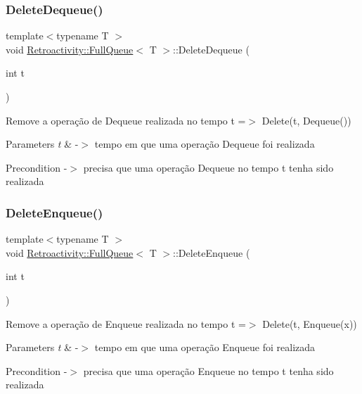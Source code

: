 \subsubsection{\texorpdfstring{Delete\+Dequeue()}{DeleteDequeue()}}
{\footnotesize\ttfamily template$<$typename T $>$ \\
void \hyperlink{classRetroactivity_1_1FullQueue}{Retroactivity\+::\+Full\+Queue}$<$ T $>$\+::Delete\+Dequeue (\begin{DoxyParamCaption}\item[{int}]{t }\end{DoxyParamCaption})}

Remove a operação de Dequeue realizada no tempo t =$>$ Delete(t, Dequeue())


\begin{DoxyParams}{Parameters}
{\em t} & -\/$>$ tempo em que uma operação Dequeue foi realizada \\
\hline
\end{DoxyParams}
\begin{DoxyPrecond}{Precondition}
-\/$>$ precisa que uma operação Dequeue no tempo t tenha sido realizada 
\end{DoxyPrecond}
\mbox{\label{classRetroactivity_1_1FullQueue_a017c3413e3df46315b1ffe23fdb9f52e}} 
\subsubsection{\texorpdfstring{Delete\+Enqueue()}{DeleteEnqueue()}}
{\footnotesize\ttfamily template$<$typename T $>$ \\
void \hyperlink{classRetroactivity_1_1FullQueue}{Retroactivity\+::\+Full\+Queue}$<$ T $>$\+::Delete\+Enqueue (\begin{DoxyParamCaption}\item[{int}]{t }\end{DoxyParamCaption})}

Remove a operação de Enqueue realizada no tempo t =$>$ Delete(t, Enqueue(x))


\begin{DoxyParams}{Parameters}
{\em t} & -\/$>$ tempo em que uma operação Enqueue foi realizada \\
\hline
\end{DoxyParams}
\begin{DoxyPrecond}{Precondition}
-\/$>$ precisa que uma operação Enqueue no tempo t tenha sido realizada 
\end{DoxyPrecond}
\mbox{\label{classRetroactivity_1_1FullQueue_ac29fbed2c33d09c0a7aac91fc26a0dd2}} 
